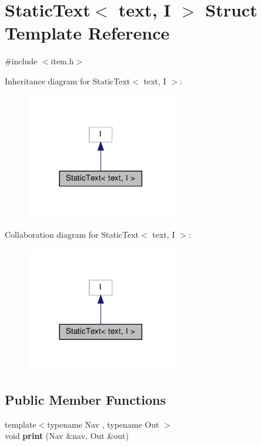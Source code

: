 \hypertarget{structStaticText}{}\section{Static\+Text$<$ text, I $>$ Struct Template Reference}
\label{structStaticText}


{\ttfamily \#include $<$item.\+h$>$}



Inheritance diagram for Static\+Text$<$ text, I $>$\+:\nopagebreak
\begin{figure}[H]
\begin{center}
\leavevmode
\includegraphics[width=185pt]{structStaticText__inherit__graph}
\end{center}
\end{figure}


Collaboration diagram for Static\+Text$<$ text, I $>$\+:\nopagebreak
\begin{figure}[H]
\begin{center}
\leavevmode
\includegraphics[width=185pt]{structStaticText__coll__graph}
\end{center}
\end{figure}
\subsection*{Public Member Functions}
\begin{DoxyCompactItemize}
\item 
\mbox{\label{structStaticText_a4a8e1297ef0651fdeb03b6b78fd65ae8}} 
{\footnotesize template$<$typename Nav , typename Out $>$ }\\void {\bfseries print} (Nav \&nav, Out \&out)
\end{DoxyCompactItemize}


